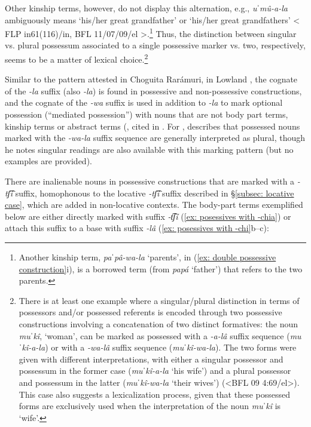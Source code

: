 Other kinship terms, however, do not display this alternation, e.g., \textit{uˈmû-a-la} ambiguously means ‘his/her great grandfather' or `his/her great grandfathers’ < FLP in61(116)/in, BFL 11/07/09/el >.\footnote{Another kinship term, \textit{paˈpâ-wa-la} ‘parents’, in (\ref{ex: double possessive construction}i), is a borrowed term (from  \textit{papá} `father') that refers to the two parents.} Thus, the distinction between singular vs. plural possessum associated to a single possessive marker vs. two, respectively, seems to be a matter of lexical choice.\footnote{There is at least one example where a singular/plural distinction in terms of possessors and/or possessed referents is encoded through two possessive constructions involving a concatenation of two distinct formatives: the noun \textit{muˈkî}, `woman', can be marked as possessed with a \textit{-a-lâ} suffix sequence (\textit{muˈkî-a-la}) or with a \textit{-wa-lâ} suffix sequence (\textit{muˈkî-wa-la}). The two forms were given with different interpretations, with either a singular possessor and possessum in the former case (\textit{muˈkî-a-la} `his wife') and a plural possessor and possessum in the latter (\textit{muˈkî-wa-la} `their wives') (<BFL 09 4:69/el>). This case also suggests a lexicalization process, given that these possessed forms are exclusively used when the interpretation of the noun \textit{muˈkî} is `wife'.}

Similar to the pattern attested in Choguita Rarámuri, in Lowland , the cognate of the \textit{-la} suffix (also \textit{-la}) is found in possessive and non-possessive constructions, and the cognate of the \textit{-wa} suffix is used in addition to \textit{-la} to mark optional possession (``mediated possession'') with nouns that are not body part terms, kinship terms or abstract terms (\citealt{barreras1988posesion}, cited in \citealt[][301]{dakin1991nahuatl}. For , \citet{miller1996guarijio} describes that possessed nouns marked with the \textit{-wa-la} suffix sequence are generally interpreted as plural, though he notes singular readings are also available with this marking pattern (but no examples are provided).

There are inalienable nouns in possessive constructions that are marked with a \textit{-tʃ͡í} suffix, homophonous to the locative  \textit{-tʃ͡í} suffix described in §\ref{subsec: locative case}, which are added in non-locative contexts. The body-part terms exemplified below are either directly marked with suffix \textit{-t͡ʃí} (\ref{ex: posessives with -chia}) or attach this suffix to a base with suffix \textit{-lâ} (\ref{ex: posessives with -chi}b--c):

